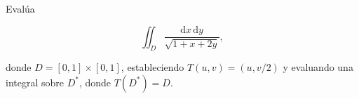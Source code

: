 Evalúa

\[\iint_D \frac{\mathrm{d}x \, \mathrm{d}y}{\sqrt{1+x+2y}},\]

donde \(D = [0,1] \times [0,1]\), estableciendo \(T(u,v) = (u, v/2)\) y evaluando una integral sobre \(D^*\), donde \(T(D^*) = D\).
